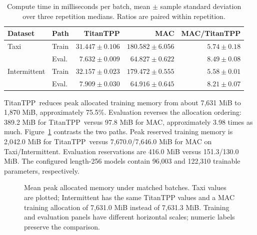 \documentclass[runningheads]{llncs}
\newcommand{\method}{TitanTPP}
\begin{document}
\begin{table}[t]
\caption{Compute time in milliseconds per batch, mean $\pm$ sample
standard deviation over three repetition medians. Ratios are paired within
repetition.}
\label{tab:cost}\centering\small
\begin{tabular}{llrrr}
\toprule
Dataset & Path & TitanTPP & MAC & MAC/TitanTPP\\
\midrule
Taxi & Train & $31.447\pm0.106$ & $180.582\pm6.056$ & $5.74\pm0.18$\\
 & Eval. & $7.632\pm0.009$ & $64.827\pm0.622$ & $8.49\pm0.08$\\
Intermittent & Train & $32.157\pm0.023$ & $179.472\pm0.555$ & $5.58\pm0.01$\\
 & Eval. & $7.909\pm0.030$ & $64.916\pm0.645$ & $8.21\pm0.07$\\
\bottomrule
\end{tabular}
\end{table}

\method\ reduces peak allocated training memory from about 7,631 MiB to
1,870 MiB, approximately 75.5\%. Evaluation reverses the allocation ordering:
389.2 MiB for \method\ versus 97.8 MiB for MAC, approximately 3.98 times
as much. Figure~\ref{fig:memory} contrasts the two paths.
Peak reserved training memory is 2,042.0 MiB for \method\ versus
7,670.0/7,646.0 MiB for MAC on Taxi/Intermittent. Evaluation reservations
are 416.0 MiB versus 151.3/130.0 MiB. The configured length-256 models
contain 96,003 and 122,310 trainable parameters, respectively.

\begin{figure}[t]
\centering
{}
\caption{Mean peak allocated memory under matched batches. Taxi values
are plotted; Intermittent has the same TitanTPP values and a MAC training
allocation of 7,631.0 MiB instead of 7,631.3 MiB. Training and evaluation
panels have different horizontal scales; numeric labels preserve the
comparison.}
\label{fig:memory}
\end{figure}
\end{document}
